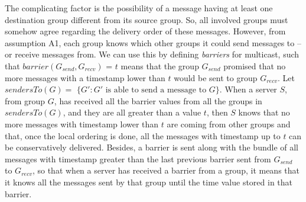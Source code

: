 \documentclass[times, 10pt]{article}
\begin{document}

The complicating factor is the possibility of a message having at least one destination group different from its source group. So, all involved groups must somehow agree regarding the delivery order of these messages. However, from assumption A1, each group knows which other groups it could send messages to -- or receive messages from. We can use this by defining \emph{barriers} for multicast, such that $barrier(G_{send},G_{recv})$ = $t$ means that the group $G_{send}$ promised that no more messages with a timestamp lower than $t$ would be sent to group $G_{recv}$. Let $sendersTo(G) =$ \mbox{$\{G' : G'\text{ is able to send a message to }G\}$}. When a server $S$, from group $G$, has received all the barrier values from all the groups in $sendersTo(G)$, and they are all greater than a value $t$, then $S$ knows that no more messages with timestamp lower than $t$ are coming from other groups and that, once the local ordering is done, all the messages with timestamp up to $t$ can be conservatively delivered. Besides, a barrier is sent along with the bundle of all messages with timestamp greater than the last previous barrier sent from $G_{send}$ to $G_{recv}$, so that when a server has received a barrier from a group, it means that it knows all the messages sent by that group until the time value stored in that barrier. 
\end{document}
